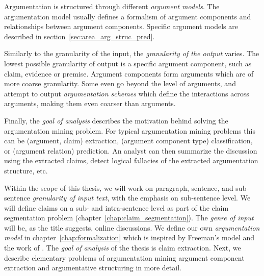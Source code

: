 Argumentation is structured through different \emph{argument models}.  The
argumentation model usually defines a formalism of argument components and
relationships between argument components.  Specific argument models are
described in section~\ref{sec:area_arg_struc_pred}.

Similarly to the granularity of the input, the \emph{granularity of the output}
varies. The lowest possible granularity of output is a specific argument
component, such as claim, evidence or premise. Argument components form arguments
which are of more coarse granularity. Some even go beyond the level of arguments, 
and attempt to output \emph{argumentation schemes} \citep{feng2011classifying} which
define the interactions across arguments, making them even coarser than arguments. 

Finally, the \emph{goal of analysis} describes the motivation behind solving
the argumentation mining problem. For typical argumentation mining problems
this can be (argument, claim) extraction, (argument component type)
classification, or (argument relation) prediction. An analyst can then 
summarize the discussion using the extracted claims, detect logical fallacies
of the extracted argumentation structure, etc.

Within the scope of this thesis, we will work on paragraph, sentence, and
sub-sentence \emph{granularity of input text}, with the emphasis on
sub-sentence level. We will define claims on a sub- and intra-sentence level as
part of the claim segmentation problem (chapter~\ref{chap:claim_segmentation}).
The \emph{genre of input} will be, as the title suggests, online discussions.
We define our own \emph{argumentation model} in
chapter~\ref{chap:formalization} which is inspired by Freeman's model and the
work of \citet{hashimoto2012excitatory}.
The \emph{goal of analysis} of the thesis is claim extraction.
Next, we describe elementary problems of argumentation mining
argument component extraction and argumentative structuring 
in more detail.



